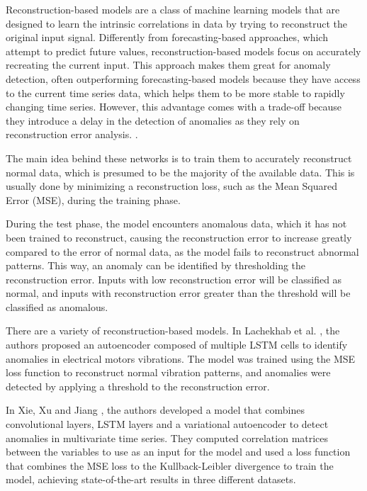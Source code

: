 Reconstruction-based models are a class of machine learning models that are designed to learn the intrinsic correlations in data by trying to reconstruct the original input signal. Differently from forecasting-based approaches, which attempt to predict future values, reconstruction-based models focus on accurately recreating the current input. This approach makes them great for anomaly detection, often outperforming forecasting-based models because they have access to the current time series data, which helps them to be more stable to rapidly changing time series. However, this advantage comes with a trade-off because they introduce a delay in the detection of anomalies as they rely on reconstruction error analysis. \cite{Zamanzadeh_Darban_Webb_Pan_Aggarwal_Salehi_2024}. 

The main idea behind these networks is to train them to accurately reconstruct normal data, which is presumed to be the majority of the available data. This is usually done by minimizing a reconstruction loss, such as the Mean Squared Error (MSE), during the training phase. 

During the test phase, the model encounters anomalous data, which it has not been trained to reconstruct, causing the reconstruction error to increase greatly compared to the error of normal data, as the model fails to reconstruct abnormal patterns. This way, an anomaly can be identified by thresholding the reconstruction error. Inputs with low reconstruction error will be classified as normal, and inputs with reconstruction error greater than the threshold will be classified as anomalous.

There are a variety of reconstruction-based models. In Lachekhab et al. \cite{en17102340}, the authors proposed an autoencoder composed of multiple LSTM cells to identify anomalies in electrical motors vibrations. The model was trained using the MSE loss function to reconstruct normal vibration patterns, and anomalies were detected by applying a threshold to the reconstruction error.

In Xie, Xu and Jiang \cite{XIE2023120725}, the authors developed a model that combines convolutional layers, LSTM layers and a variational autoencoder to detect anomalies in multivariate time series. They computed correlation matrices between the variables to use as an input for the model and used a loss function that combines the MSE loss to the Kullback-Leibler divergence to train the model, achieving state-of-the-art results in three different datasets.

